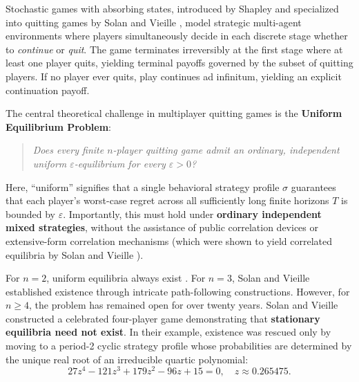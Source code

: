 \documentclass[11pt,a4paper]{article}
\theoremstyle{definition}
\begin{document}
Stochastic games with absorbing states, introduced by Shapley \cite{shapley1953} and specialized into quitting games by Solan and Vieille \cite{solan2001}, model strategic multi-agent environments where players simultaneously decide in each discrete stage whether to \textit{continue} or \textit{quit}. The game terminates irreversibly at the first stage where at least one player quits, yielding terminal payoffs governed by the subset of quitting players. If no player ever quits, play continues ad infinitum, yielding an explicit continuation payoff.

The central theoretical challenge in multiplayer quitting games is the \textbf{Uniform Equilibrium Problem}:
\begin{quote}
\textit{Does every finite $n$-player quitting game admit an ordinary, independent uniform $\varepsilon$-equilibrium for every $\varepsilon > 0$?}
\end{quote}

Here, ``uniform'' signifies that a single behavioral strategy profile $\sigma$ guarantees that each player's worst-case regret across all sufficiently long finite horizons $T$ is bounded by $\varepsilon$. Importantly, this must hold under \textbf{ordinary independent mixed strategies}, without the assistance of public correlation devices or extensive-form correlation mechanisms (which were shown to yield correlated equilibria by Solan and Vieille \cite{solan2002}).

For $n = 2$, uniform equilibria always exist \cite{solan2001}. For $n = 3$, Solan and Vieille \cite{solan2001} established existence through intricate path-following constructions. However, for $n \ge 4$, the problem has remained open for over twenty years. Solan and Vieille \cite{solan2002} constructed a celebrated four-player game demonstrating that \textbf{stationary equilibria need not exist}. In their example, existence was rescued only by moving to a period-2 cyclic strategy profile whose probabilities are determined by the unique real root of an irreducible quartic polynomial:
\begin{equation}
27z^4 - 121z^3 + 179z^2 - 96z + 15 = 0, \quad z \approx 0.265475.
\end{equation}
\end{document}
